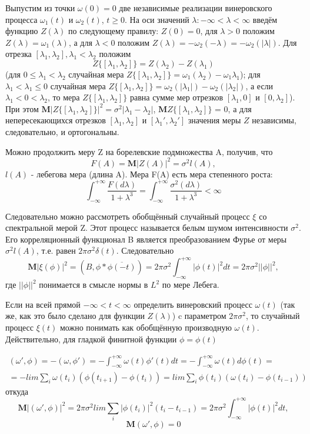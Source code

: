 Выпустим из точки $\omega(0) = 0$ две независимые реализации винеровского процесса $\omega_1(t)$ и $\omega_2(t)$, $t \geq 0$. На оси значений $\lambda: -\infty < \lambda < \infty$ введём функцию $Z(\lambda)$ по следующему правилу: $Z(0) = 0$, для $\lambda > 0$
положим $Z(\lambda) = \omega_1(\lambda)$, а для $\lambda < 0$
положим $Z(\lambda) = -\omega_2(-\lambda) = -\omega_2(|\lambda|)$. Для отрезка $[\lambda_1, \lambda_2], \lambda_1 < \lambda_2$ положим
$$Z\{[\lambda_1, \lambda_2]\} = Z(\lambda_2) - Z(\lambda_1)$$
(для $0 \leq \lambda_1 < \lambda_2$ случайная мера $Z\{[\lambda_1, \lambda_2]\} = \omega_1(\lambda_2) - \omega_1{\lambda_1}$);
для $\lambda_1 < \lambda_1 \leq 0$ случайная мера $Z\{[\lambda_1, \lambda_2]\} = \omega_2(|\lambda_1|) - \omega_2(|\lambda_2|)$, а если $\lambda_1 < 0 < \lambda_2$, то мера $Z\{[\lambda_1, \lambda_2]\}$ равна сумме мер отрезков $[\lambda_1, 0]$ и $[0, \lambda_2]$). При этом $\textbf{M}|Z\{[\lambda_1, \lambda_2]\}|^2 = \sigma^2|\lambda_1 - \lambda_2|$, $\textbf{M}Z\{[\lambda_1, \lambda_2]\}$ = 0, а для непересекающихся отрезков $[\lambda_1, \lambda_2]$ и $[\lambda_1', \lambda_2']$ значения меры $Z$ независимы, следовательно, и ортогональны.

Можно продолжить меру Z на борелевские подмножества A, получив, что 
$$F(A) = \textbf{M}|Z(A)|^2 = \sigma^2 l(A),$$ $l(A)$ - лебегова мера (длина A). Мера F(A) есть мера степенного роста: 
$$\int_{-\infty}^{+\infty}\frac{F(d\lambda)}{1 + \lambda ^ 3} = \int_{-\infty}^{+\infty}\frac{\sigma^2(d\lambda)}{1 + \lambda ^ 3} < \infty$$

Следовательно можно рассмотреть обобщённый случайный процесс $\xi$ со спектральной мерой Z. Этот процесс называется белым шумом интенсивности $\sigma^2$. Его корреляционный функционал B является преобразованием Фурье от меры $\sigma ^2l(A)$, т.е. равен $2\pi \sigma^2 \delta(t)$. Следовательно $$\textbf{M}|\xi(\phi)| ^ 2 = (B, \phi * \overline{\phi(-t)}) = 2\pi\sigma^2 \int_{-\infty}^{+\infty} |\phi(t)|^2 dt = 2\pi\sigma^2||\phi||^2,$$ где $||\phi||^2$ понимается в смысле нормы в $L^2$ по мере Лебега.

Если на всей прямой $-\infty < t < \infty$ определить винеровский процесс $\omega(t)$ (так же, как это было сделано для функции $Z(\lambda)$) c параметром $2\pi\sigma^2$, то случайный процесс $\xi(t)$ можно понимать как обобщённую производную $\omega(t)$. Действительно, для гладкой финитной функции $\phi = \phi(t)$

\begin{multline*}
  (\omega', \phi) = -(\omega, \phi') = -\int_{-\infty}^{+\infty} \omega(t)\phi'(t)dt = -\int_{-\infty}^{+\infty}\omega(t)d\phi(t) = \\ = -lim \sum_{i}\omega(t_i)(\phi(t_{i+1}) - \phi(t_{i})) = lim \sum_{i}\phi(t_i)(\omega(t_{i}) - \phi(t_{i-1}))  
\end{multline*}
откуда 
$$\textbf{M}|(\omega', \phi)|^2 = 2\pi\sigma^2 lim \sum_{i}|\phi(t_i)|^2 (t_i - t_{i-1}) = 2\pi\sigma^2\int_{-\infty}^{+\infty} |\phi(t)|^2 dt, $$
$$\textbf{M}(\omega', \phi) = 0$$

